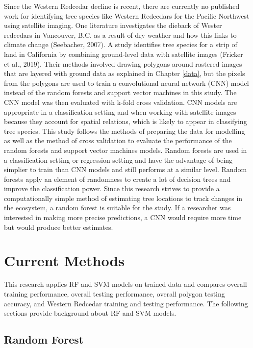 \documentclass[12pt,twoside]{reedthesis}
\begin{document}
Since the Western Redcedar decline is recent, there are currently no published work for identifying tree species like Western Redcedars for the Pacific Northwest using satellite imaging. One literature investigates the dieback of Wester redcedars in Vancouver, B.C. as a result of dry weather and how this links to climate change (Seebacher, 2007). A study identifies tree species for a strip of land in California by combining ground-level data with satellite images (Fricker et al., 2019). Their methods involved drawing polygons around rastered images that are layered with ground data as explained in Chapter \ref{data}, but the pixels from the polygons are used to train a convolutional neural network (CNN) model instead of the random forests and support vector machines in this study. The CNN model was then evaluated with k-fold cross validation. CNN models are appropriate in a classification setting and when working with satellite images because they account for spatial relations, which is likely to appear in classifying tree species. This study follows the methods of preparing the data for modelling as well as the method of cross validation to evaluate the performance of the random forests and support vector machines models. Random forests are used in a classification setting or regression setting and have the advantage of being simplier to train than CNN models and still performs at a similar level. Random forests apply an element of randomness to create a lot of decision trees and improve the classification power. Since this research strives to provide a computationally simple method of estimating tree locations to track changes in the ecosystem, a random forest is suitable for the study. If a researcher was interested in making more precise predictions, a CNN would require more time but would produce better estimates.

\hypertarget{current-methods}{%
\section{Current Methods}\label{current-methods}}

This research applies RF and SVM models on trained data and compares overall training performance, overall testing performance, overall polygon testing accuracy, and Western Redcedar training and testing performance. The following sections provide background about RF and SVM models.

\hypertarget{random-forest}{%
\subsection{Random Forest}\label{random-forest}}
\end{document}
